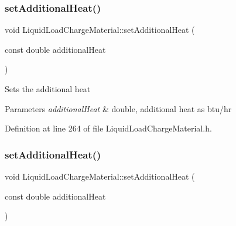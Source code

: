 \mbox{\label{class_liquid_load_charge_material_a557c1f588cfb972ff0c7f748d6c2bd8f}} 
\subsubsection{\texorpdfstring{set\+Additional\+Heat()}{setAdditionalHeat()}\hspace{0.1cm}{\footnotesize\ttfamily [1/3]}}
{\footnotesize\ttfamily void Liquid\+Load\+Charge\+Material\+::set\+Additional\+Heat (\begin{DoxyParamCaption}\item[{const double}]{additional\+Heat }\end{DoxyParamCaption})\hspace{0.3cm}{\ttfamily [inline]}}

Sets the additional heat 
\begin{DoxyParams}{Parameters}
{\em additional\+Heat} & double, additional heat as btu/hr \\
\hline
\end{DoxyParams}


Definition at line 264 of file Liquid\+Load\+Charge\+Material.\+h.

\mbox{\label{class_liquid_load_charge_material_a557c1f588cfb972ff0c7f748d6c2bd8f}} 
\subsubsection{\texorpdfstring{set\+Additional\+Heat()}{setAdditionalHeat()}\hspace{0.1cm}{\footnotesize\ttfamily [2/3]}}
{\footnotesize\ttfamily void Liquid\+Load\+Charge\+Material\+::set\+Additional\+Heat (\begin{DoxyParamCaption}\item[{const double}]{additional\+Heat }\end{DoxyParamCaption})\hspace{0.3cm}{\ttfamily [inline]}}

